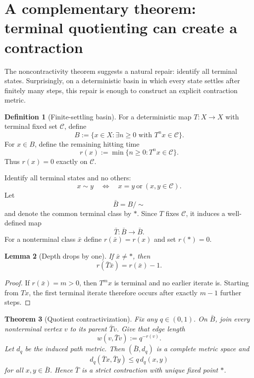 \documentclass[11pt]{article}
\newtheorem{theorem}{Theorem}[section]
\newtheorem{lemma}[theorem]{Lemma}
\theoremstyle{definition}
\newtheorem{definition}[theorem]{Definition}
\theoremstyle{remark}
\newcommand{\Cset}{\mathcal C}
\begin{document}
\section{A complementary theorem: terminal quotienting can create a contraction}

The noncontractivity theorem suggests a natural repair: identify all terminal states. Surprisingly, on a deterministic basin in which every state settles after finitely many steps, this repair is enough to construct an explicit contraction metric.

\begin{definition}[Finite-settling basin]
For a deterministic map $T:X\to X$ with terminal fixed set $\Cset$, define
\[
B:=\{x\in X:\exists n\ge0\text{ with }T^n x\in\Cset\}.
\]
For $x\in B$, define the remaining hitting time
\[
r(x):=\min\{n\ge0:T^n x\in\Cset\}.
\]
Thus $r(x)=0$ exactly on $\Cset$.
\end{definition}

Identify all terminal states and no others:
\[
x\sim y
\quad\Longleftrightarrow\quad
x=y\ \text{or}\ (x,y\in\Cset).
\]
Let
\[
\bar B=B/{\sim}
\]
and denote the common terminal class by $*$. Since $T$ fixes $\Cset$, it induces a well-defined map
\[
\bar T:\bar B\to\bar B.
\]
For a nonterminal class $\bar x$ define $r(\bar x)=r(x)$ and set $r(*)=0$.

\begin{lemma}[Depth drops by one]\label{lem:rminus}
If $\bar x\neq *$, then
\[
r(\bar T\bar x)=r(\bar x)-1.
\]
\end{lemma}

\begin{proof}
If $r(\bar x)=m>0$, then $T^m x$ is terminal and no earlier iterate is. Starting from $Tx$, the first terminal iterate therefore occurs after exactly $m-1$ further steps.
\end{proof}

\begin{theorem}[Quotient contractivization]\label{thm:quotcontract}
Fix any $q\in(0,1)$. On $\bar B$, join every nonterminal vertex $v$ to its parent $\bar T v$. Give that edge length
\[
w(v,\bar T v):=q^{-r(v)}.
\]
Let $d_q$ be the induced path metric. Then $(\bar B,d_q)$ is a complete metric space and
\[
d_q(\bar T x,\bar T y)\le q\,d_q(x,y)
\]
for all $x,y\in\bar B$. Hence $\bar T$ is a strict contraction with unique fixed point $*$.
\end{theorem}
\end{document}
